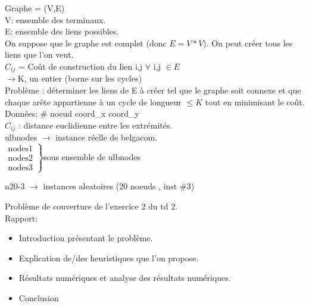 \documentclass[frenchb]{article}
\begin{document}
				Graphe = (V,E) \\
				V: ensemble des terminaux.\\
				E: ensemble des liens possibles.\\
				On suppose que le graphe est complet (donc $E=V*V$). On peut créer tous les liens que l'on veut.\\
				
				$C_{ij}$ = Coût de construction du lien i,j $\forall $ i,j $\in E $\\
				
				$\rightarrow $K, un entier (borne sur les cycles)\\
				
				Problème : déterminer les liens de E à créer tel que le graphe soit connexe et que chaque arête appartienne à un cycle de longueur $\le K$ tout en minimisant le coût.\\
				
				
				
				Données: \# noeud coord\_x  coord\_y\\
				
				$C_{ij}$ : distance euclidienne entre les extrémités.\\
				
				ulbnodes $\rightarrow$ instance réelle de belgacom.\\
				
				
				$
				\left.
				\begin{array}{l}
					\mbox{nodes1}\\
					\mbox{nodes2}\\
					\mbox{nodes3}
				\end{array}
				\right \}$sous ensemble de ulbnodes 
				
				
				n20-3 $\rightarrow$ instances aleatoires (20 noeuds , inst \#3)
				
				
				
				Problème de couverture de l'exercice 2 du td 2.\\
				Rapport: 
				\begin{itemize}
					\item Introduction présentant le problème.\\
					\item Explication de/des heuristiques que l'on propose.\\
					\item Résultats numériques et analyse des résultats numériques.
					\item Conclusion
				\end{itemize}
		    
\end{document}
